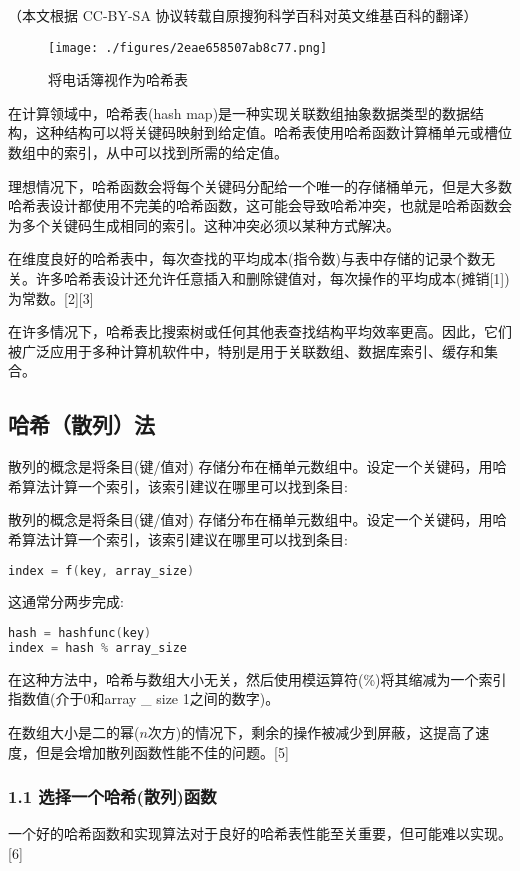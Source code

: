 
（本文根据 CC-BY-SA 协议转载自原搜狗科学百科对英文维基百科的翻译）
\begin{figure}[ht]
\centering
\texttt{[image: ./figures/2eae658507ab8c77.png]}
\caption{将电话簿视作为哈希表} \label{fig_HXB_5}
\end{figure}

在计算领域中，哈希表(hash map)是一种实现关联数组抽象数据类型的数据结构，这种结构可以将关键码映射到给定值。哈希表使用哈希函数计算桶单元或槽位数组中的索引，从中可以找到所需的给定值。

理想情况下，哈希函数会将每个关键码分配给一个唯一的存储桶单元，但是大多数哈希表设计都使用不完美的哈希函数，这可能会导致哈希冲突，也就是哈希函数会为多个关键码生成相同的索引。这种冲突必须以某种方式解决。

在维度良好的哈希表中，每次查找的平均成本(指令数)与表中存储的记录个数无关。许多哈希表设计还允许任意插入和删除键值对，每次操作的平均成本(摊销[1])为常数。[2][3]

在许多情况下，哈希表比搜索树或任何其他表查找结构平均效率更高。因此，它们被广泛应用于多种计算机软件中，特别是用于关联数组、数据库索引、缓存和集合。

\subsection{ 哈希（散列）法}
散列的概念是将条目(键/值对) 存储分布在桶单元数组中。设定一个关键码，用哈希算法计算一个索引，该索引建议在哪里可以找到条目:

散列的概念是将条目(键/值对) 存储分布在桶单元数组中。设定一个关键码，用哈希算法计算一个索引，该索引建议在哪里可以找到条目:
\begin{lstlisting}[language=cpp]
index = f(key, array_size)
\end{lstlisting}
这通常分两步完成:
\begin{lstlisting}[language=cpp]
hash = hashfunc(key)
index = hash % array_size
\end{lstlisting}
在这种方法中，哈希与数组大小无关，然后使用模运算符(\%)将其缩减为一个索引指数值(介于0和array _ size 1之间的数字)。

在数组大小是二的幂($n$次方)的情况下，剩余的操作被减少到屏蔽，这提高了速度，但是会增加散列函数性能不佳的问题。[5]

\subsubsection{1.1 选择一个哈希(散列)函数}
一个好的哈希函数和实现算法对于良好的哈希表性能至关重要，但可能难以实现。[6]

